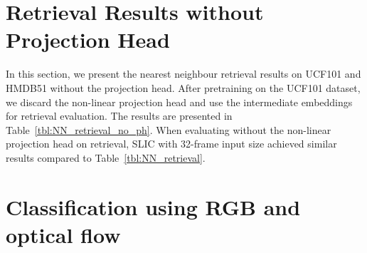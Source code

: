 \documentclass[10pt,twocolumn,letterpaper]{article}
\begin{document}
\section{Retrieval Results without Projection Head}
\label{retrieval_results_wo_projection_head}
In this section, we present the nearest neighbour retrieval results on UCF101 and HMDB51 without the projection head. After pretraining on the UCF101 dataset, we discard the non-linear projection head and use the intermediate embeddings for retrieval evaluation. The results are presented in Table~\ref{tbl:NN_retrieval_no_ph}. When evaluating without the non-linear projection head on retrieval, SLIC with 32-frame input size achieved similar results compared to Table~\ref{tbl:NN_retrieval}.
\begin{table}[ht]
  \vspace{-0.15cm}
\caption{\textbf{Video retrieval results without projection head} on UCF101 and HMDB51.
 indicates the temporal input size. } 
  \vspace{-0.2cm}
  \label{tbl:NN_retrieval_no_ph}
  \centering

\end{table}



\section{Classification using RGB and optical flow}
\label{action_classif_dualview}
\end{document}
